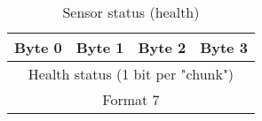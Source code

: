 \begin{table}[H]
    \centering
    {
    \begin{tabular}{|c c c c|}
        \hline
        \textbf{Byte 0} & \textbf{Byte 1} & \textbf{Byte 2}  & \textbf{Byte 3}\\
        \hline
        \hline
        \multicolumn{4}{|c|}{Health status (1 bit per "chunk")}\\
        \multicolumn{4}{|c|}{Format 7}\\
        \hline
    \end{tabular}
    }
    \caption{Sensor status (health)}
    \label{table:sensor14}
\end{table}

